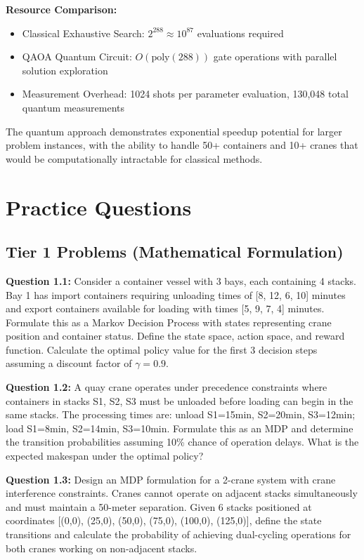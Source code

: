 \documentclass{article}
\begin{document}
\textbf{Resource Comparison:}
\begin{itemize}
\item Classical Exhaustive Search: $2^{288} \approx 10^{87}$ evaluations required
\item QAOA Quantum Circuit: $O(\text{poly}(288))$ gate operations with parallel solution exploration
\item Measurement Overhead: 1024 shots per parameter evaluation, 130,048 total quantum measurements
\end{itemize}

The quantum approach demonstrates exponential speedup potential for larger problem instances, with the ability to handle 50+ containers and 10+ cranes that would be computationally intractable for classical methods.

\section{Practice Questions}

\subsection{Tier 1 Problems (Mathematical Formulation)}

\textbf{Question 1.1:} Consider a container vessel with 3 bays, each containing 4 stacks. Bay 1 has import containers requiring unloading times of [8, 12, 6, 10] minutes and export containers available for loading with times [5, 9, 7, 4] minutes. Formulate this as a Markov Decision Process with states representing crane position and container status. Define the state space, action space, and reward function. Calculate the optimal policy value for the first 3 decision steps assuming a discount factor of $\gamma = 0.9$.

\textbf{Question 1.2:} A quay crane operates under precedence constraints where containers in stacks S1, S2, S3 must be unloaded before loading can begin in the same stacks. The processing times are: unload S1=15min, S2=20min, S3=12min; load S1=8min, S2=14min, S3=10min. Formulate this as an MDP and determine the transition probabilities assuming 10\% chance of operation delays. What is the expected makespan under the optimal policy?

\textbf{Question 1.3:} Design an MDP formulation for a 2-crane system with crane interference constraints. Cranes cannot operate on adjacent stacks simultaneously and must maintain a 50-meter separation. Given 6 stacks positioned at coordinates [(0,0), (25,0), (50,0), (75,0), (100,0), (125,0)], define the state transitions and calculate the probability of achieving dual-cycling operations for both cranes working on non-adjacent stacks.
\end{document}
